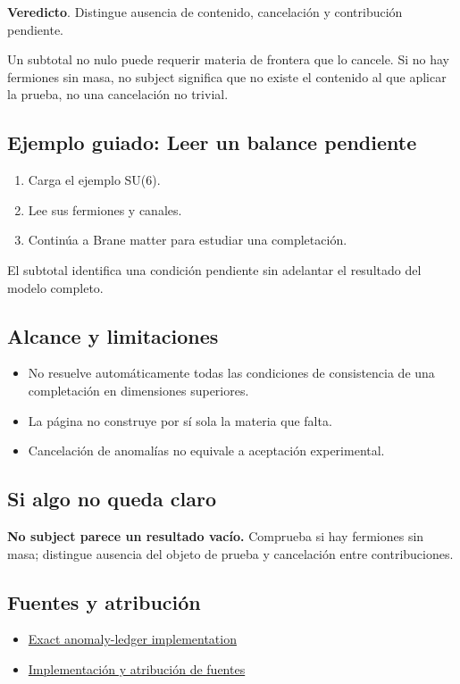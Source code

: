 \documentclass[11pt,a4paper]{article}
\begin{document}
\textbf{Veredicto}. Distingue ausencia de contenido, cancelación y contribución pendiente.

Un subtotal no nulo puede requerir materia de frontera que lo cancele. Si no hay fermiones sin masa, no subject significa que no existe el contenido al que aplicar la prueba, no una cancelación no trivial.
\subsection*{Ejemplo guiado: Leer un balance pendiente}
\begin{enumerate}
\item Carga el ejemplo SU(6).
\item Lee sus fermiones y canales.
\item Continúa a Brane matter para estudiar una completación.
\end{enumerate}
El subtotal identifica una condición pendiente sin adelantar el resultado del modelo completo.
\subsection*{Alcance y limitaciones}
\begin{itemize}
\item No resuelve automáticamente todas las condiciones de consistencia de una completación en dimensiones superiores.
\item La página no construye por sí sola la materia que falta.
\item Cancelación de anomalías no equivale a aceptación experimental.
\end{itemize}
\subsection*{Si algo no queda claro}
\textbf{No subject parece un resultado vacío.} Comprueba si hay fermiones sin masa; distingue ausencia del objeto de prueba y cancelación entre contribuciones.

\subsection*{Fuentes y atribución}
\begin{itemize}
\item \href{https://github.com/karlesmarin/ghu-lab/blob/main/src/modules/anomaly5d.mjs}{Exact anomaly-ledger implementation}
\item \href{https://github.com/karlesmarin/ghu-lab/blob/main/src/sections/anomaly5d_section.js}{Implementación y atribución de fuentes}
\end{itemize}
\end{document}
